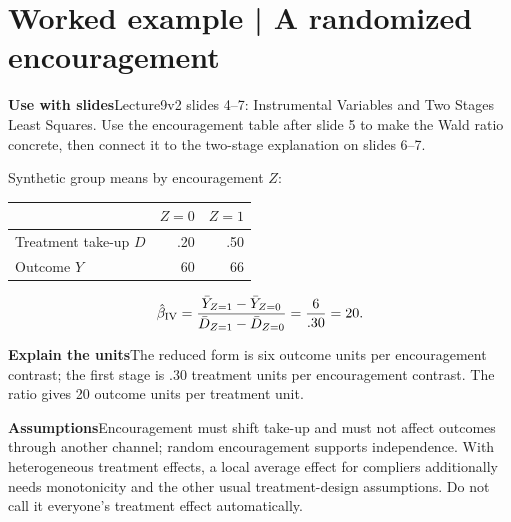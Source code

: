 \documentclass[11pt,a4paper]{article}
\newcommand{\heading}[1]{\section*{\color{accent}#1}}
\newcommand{\cue}[2]{\par\noindent\textbf{#1}\quad #2\par}
\begin{document}
\heading{Worked example | A randomized encouragement}
\cue{Use with slides}{Lecture9v2 slides 4--7: Instrumental Variables and Two Stages Least Squares. Use the encouragement table after slide 5 to make the Wald ratio concrete, then connect it to the two-stage explanation on slides 6--7.}
Synthetic group means by encouragement $Z$:
\begin{center}\begin{tabular}{lrr}\toprule
 & $Z=0$ & $Z=1$\\\midrule
Treatment take-up $D$ & .20 & .50\\
Outcome $Y$ & 60 & 66\\\bottomrule
\end{tabular}\end{center}
\[
\hat\beta_{\rm IV}=
\frac{\bar Y_{Z=1}-\bar Y_{Z=0}}{\bar D_{Z=1}-\bar D_{Z=0}}
=\frac6{.30}=20.
\]
\cue{Explain the units}{The reduced form is six outcome units per encouragement contrast; the first stage is $.30$ treatment units per encouragement contrast. The ratio gives 20 outcome units per treatment unit.}
\cue{Assumptions}{Encouragement must shift take-up and must not affect outcomes through another channel; random encouragement supports independence. With heterogeneous treatment effects, a local average effect for compliers additionally needs monotonicity and the other usual treatment-design assumptions. Do not call it everyone's treatment effect automatically.}
\end{document}
